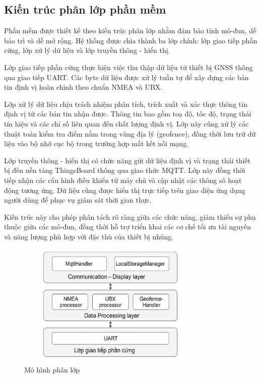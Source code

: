 \documentclass[../DoAn.tex]{subfiles}
\begin{document}
\subsection{Kiến trúc phân lớp phần mềm}
Phần mềm được thiết kế theo kiến trúc phân lớp nhằm đảm bảo tính mô-đun, dễ bảo trì và dễ mở rộng. Hệ thống được chia thành ba lớp chính: lớp giao tiếp phần cứng, lớp xử lý dữ liệu và lớp truyền thông - hiển thị.

Lớp giao tiếp phần cứng thực hiện việc thu thập dữ liệu từ thiết bị GNSS thông qua giao tiếp UART. Các byte dữ liệu được xử lý tuần tự để xây dựng các bản tin định vị hoàn chỉnh theo chuẩn NMEA và UBX.

Lớp xử lý dữ liệu chịu trách nhiệm phân tích, trích xuất và xác thực thông tin định vị từ các bản tin nhận được. Thông tin bao gồm toạ độ, tốc độ, trạng thái tín hiệu và các chỉ số liên quan đến chất lượng định vị. Lớp này cũng xử lý các thuật toán kiểm tra điểm nằm trong vùng địa lý (geofence), đồng thời lưu trữ dữ liệu vào bộ nhớ cục bộ trong trường hợp mất kết nối mạng.

Lớp truyền thông - hiển thị có chức năng gửi dữ liệu định vị và trạng thái thiết bị đến nền tảng ThingsBoard thông qua giao thức MQTT. Lớp này đồng thời tiếp nhận các cấu hình điều khiển từ máy chủ và cập nhật các thông số hoạt động tương ứng. Dữ liệu cũng được hiển thị trực tiếp trên giao diện ứng dụng người dùng để phục vụ giám sát thời gian thực.

Kiến trúc này cho phép phân tách rõ ràng giữa các chức năng, giảm thiểu sự phụ thuộc giữa các mô-đun, đồng thời hỗ trợ triển khai các cơ chế tối ưu tài nguyên và năng lượng phù hợp với đặc thù của thiết bị nhúng.

\begin{figure}[H]
    \centering
    \includegraphics[width=0.8\textwidth]{Hinhve/System.png}
    \caption{Mô hình phân lớp}
\end{figure}
\end{document}
